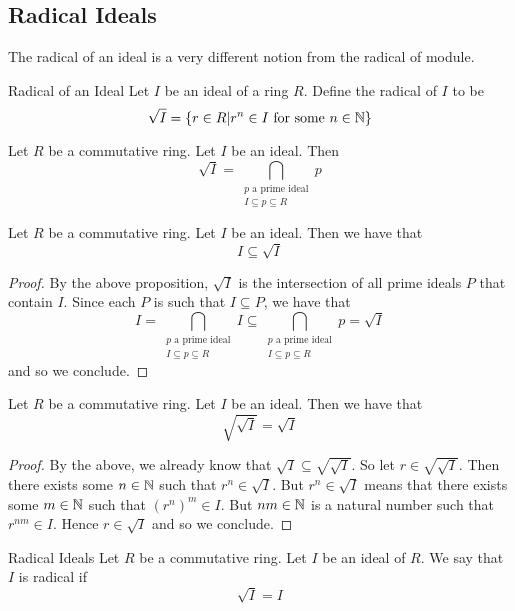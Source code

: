 \documentclass[a4paper]{article}
\begin{document}
\subsection{Radical Ideals}
The radical of an ideal is a very different notion from the radical of module. 

\begin{defn}{Radical of an Ideal}{} Let $I$ be an ideal of a ring $R$. Define the radical of $I$ to be $$\sqrt{I}=\{r\in R|r^n\in I\text{ for some }n\in\mathbb{N}\}$$
\end{defn}

\begin{prp}{}{} Let $R$ be a commutative ring. Let $I$ be an ideal. Then $$\sqrt{I}=\bigcap_{\substack{p\text{ a prime ideal}\\I\subseteq p\subseteq R}}p$$
\end{prp}

\begin{crl}{}{} Let $R$ be a commutative ring. Let $I$ be an ideal. Then we have that $$I\subseteq\sqrt{I}$$ \tcbline
\begin{proof}
By the above proposition, $\sqrt{I}$ is the intersection of all prime ideals $P$ that contain $I$. Since each $P$ is such that $I\subseteq P$, we have that $$I=\bigcap_{\substack{p\text{ a prime ideal}\\I\subseteq p\subseteq R}}I\subseteq\bigcap_{\substack{p\text{ a prime ideal}\\I\subseteq p\subseteq R}}p=\sqrt{I}$$ and so we conclude. 
\end{proof}
\end{crl}

\begin{crl}{}{} Let $R$ be a commutative ring. Let $I$ be an ideal. Then we have that $$\sqrt{\sqrt{I}}=\sqrt{I}$$ \tcbline
\begin{proof}
By the above, we already know that $\sqrt{I}\subseteq\sqrt{\sqrt{I}}$. So let $r\in\sqrt{\sqrt{I}}$. Then there exists some $n\in\mathbb{N}$ such that $r^n\in\sqrt{I}$. But $r^n\in\sqrt{I}$ means that there exists some $m\in\mathbb{N}$ such that $(r^n)^m\in I$. But $nm\in\mathbb{N}$ is a natural number such that $r^{nm}\in I$. Hence $r\in\sqrt{I}$ and so we conclude. 
\end{proof}
\end{crl}

\begin{defn}{Radical Ideals}{} Let $R$ be a commutative ring. Let $I$ be an ideal of $R$. We say that $I$ is radical if $$\sqrt{I}=I$$
\end{defn}
\end{document}
